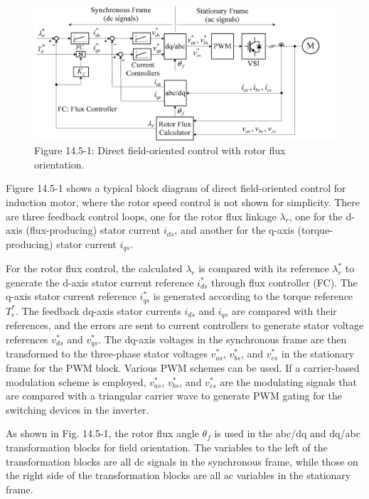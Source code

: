 \documentclass[letterpaper,12pt]{article}
\begin{document}
\begin{figure}[h]
\centering
\includegraphics{graficos/img13.jpg}
\caption{Figure 14.5-1: Direct field-oriented control with rotor flux orientation.}
\end{figure}
\FloatBarrier

Figure 14.5-1 shows a typical block diagram of direct field-oriented control for induction motor, where the rotor speed control is not shown for simplicity. There are three feedback control loops, one for the rotor flux linkage $\lambda_r$, one for the d-axis (flux-producing) stator current $i_{ds}$, and another for the q-axis (torque-producing) stator current $i_{qs}$.

For the rotor flux control, the calculated $\lambda_r$ is compared with its reference $\lambda_r^*$ to generate the d-axis stator current reference $i_{ds}^*$ through flux controller (FC). The q-axis stator current reference $i_{qs}^*$ is generated according to the torque reference $T_e^*$. The feedback dq-axis stator currents $i_{ds}$ and $i_{qs}$ are compared with their references, and the errors are sent to current controllers to generate stator voltage references $v_{ds}^*$ and $v_{qs}^*$. The dq-axis voltages in the synchronous frame are then transformed to the three-phase stator voltages $v_{as}^*$, $v_{bs}^*$, and $v_{cs}^*$ in the stationary frame for the PWM block. Various PWM schemes can be used. If a carrier-based modulation scheme is employed, $v_{as}^*$, $v_{bs}^*$, and $v_{cs}^*$ are the modulating signals that are compared with a triangular carrier wave to generate PWM gating for the switching devices in the inverter.

As shown in Fig. 14.5-1, the rotor flux angle $\theta_f$ is used in the abc/dq and dq/abc transformation blocks for field orientation. The variables to the left of the transformation blocks are all dc signals in the synchronous frame, while those on the right side of the transformation blocks are all ac variables in the stationary frame.
\end{document}
